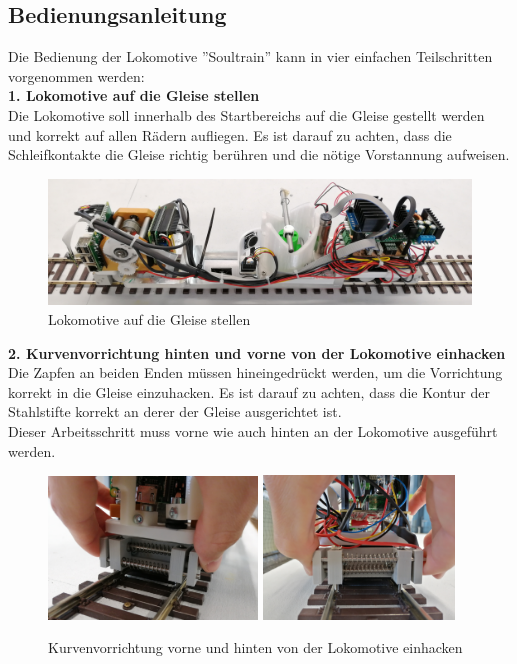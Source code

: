 \documentclass[../../main.tex]{subfiles}
\begin{document}
\subsection{Bedienungsanleitung}

Die Bedienung der Lokomotive ''Soultrain'' kann in vier einfachen Teilschritten vorgenommen werden:\\

\textbf{1. Lokomotive auf die Gleise stellen}\\
Die Lokomotive soll innerhalb des Startbereichs auf die Gleise gestellt werden und korrekt auf allen Rädern aufliegen.
Es ist darauf zu achten, dass die Schleifkontakte die Gleise richtig berühren und die nötige Vorstannung aufweisen.

\begin{figure}[H]
  \centering
  \includegraphics[width=1\textwidth]{montagezug.PNG}
  \caption {Lokomotive auf die Gleise stellen}
  \label{fig:montagezug}
\end{figure}

\textbf{2. Kurvenvorrichtung hinten und vorne von der Lokomotive einhacken}\\
Die Zapfen an beiden Enden müssen hineingedrückt werden, um die Vorrichtung korrekt in die Gleise einzuhacken. Es ist darauf zu achten, dass die Kontur der Stahlstifte korrekt an derer der Gleise ausgerichtet ist.\\
Dieser Arbeitsschritt muss vorne wie auch hinten an der Lokomotive ausgeführt werden.

\begin{figure}[H]
  \centering
  \includegraphics[width=0.495\textwidth]{../../images/Maschinentechnik/montagevorne.PNG}
  \includegraphics[width=0.455\textwidth]{../../images/Maschinentechnik/montagehinten.PNG}
  \caption {Kurvenvorrichtung vorne und hinten von der Lokomotive einhacken}
\end{figure}
\end{document}

